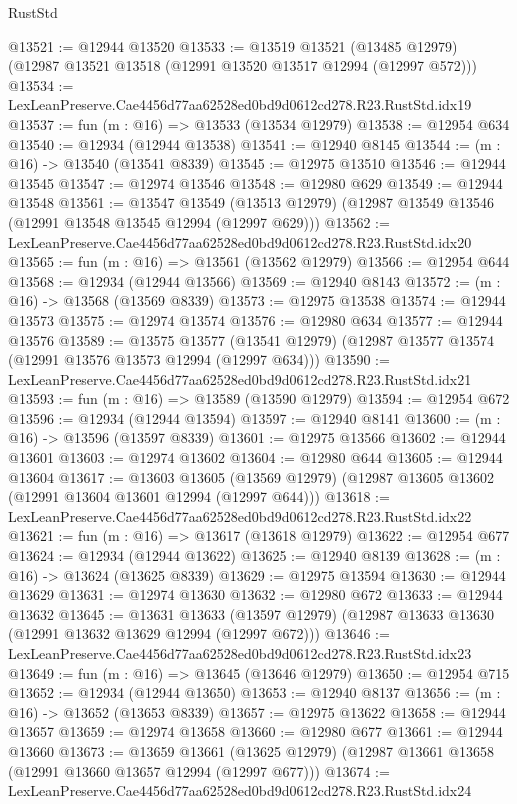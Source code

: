 \begin{lexlean}{RustStd}
\begin{coremodule}
@13521 := @12944 @13520
@13533 := @13519
    @13521
    (@13485 @12979)
    (@12987 @13521 @13518 (@12991 @13520 @13517 @12994 (@12997 @572)))
@13534 := LexLeanPreserve.Cae4456d77aa62528ed0bd9d0612cd278.R23.RustStd.idx19
@13537 := fun (m : @16) => @13533 (@13534 @12979)
@13538 := @12954 @634
@13540 := @12934 (@12944 @13538)
@13541 := @12940 @8145
@13544 := (m : @16) -> @13540 (@13541 @8339)
@13545 := @12975 @13510
@13546 := @12944 @13545
@13547 := @12974 @13546
@13548 := @12980 @629
@13549 := @12944 @13548
@13561 := @13547
    @13549
    (@13513 @12979)
    (@12987 @13549 @13546 (@12991 @13548 @13545 @12994 (@12997 @629)))
@13562 := LexLeanPreserve.Cae4456d77aa62528ed0bd9d0612cd278.R23.RustStd.idx20
@13565 := fun (m : @16) => @13561 (@13562 @12979)
@13566 := @12954 @644
@13568 := @12934 (@12944 @13566)
@13569 := @12940 @8143
@13572 := (m : @16) -> @13568 (@13569 @8339)
@13573 := @12975 @13538
@13574 := @12944 @13573
@13575 := @12974 @13574
@13576 := @12980 @634
@13577 := @12944 @13576
@13589 := @13575
    @13577
    (@13541 @12979)
    (@12987 @13577 @13574 (@12991 @13576 @13573 @12994 (@12997 @634)))
@13590 := LexLeanPreserve.Cae4456d77aa62528ed0bd9d0612cd278.R23.RustStd.idx21
@13593 := fun (m : @16) => @13589 (@13590 @12979)
@13594 := @12954 @672
@13596 := @12934 (@12944 @13594)
@13597 := @12940 @8141
@13600 := (m : @16) -> @13596 (@13597 @8339)
@13601 := @12975 @13566
@13602 := @12944 @13601
@13603 := @12974 @13602
@13604 := @12980 @644
@13605 := @12944 @13604
@13617 := @13603
    @13605
    (@13569 @12979)
    (@12987 @13605 @13602 (@12991 @13604 @13601 @12994 (@12997 @644)))
@13618 := LexLeanPreserve.Cae4456d77aa62528ed0bd9d0612cd278.R23.RustStd.idx22
@13621 := fun (m : @16) => @13617 (@13618 @12979)
@13622 := @12954 @677
@13624 := @12934 (@12944 @13622)
@13625 := @12940 @8139
@13628 := (m : @16) -> @13624 (@13625 @8339)
@13629 := @12975 @13594
@13630 := @12944 @13629
@13631 := @12974 @13630
@13632 := @12980 @672
@13633 := @12944 @13632
@13645 := @13631
    @13633
    (@13597 @12979)
    (@12987 @13633 @13630 (@12991 @13632 @13629 @12994 (@12997 @672)))
@13646 := LexLeanPreserve.Cae4456d77aa62528ed0bd9d0612cd278.R23.RustStd.idx23
@13649 := fun (m : @16) => @13645 (@13646 @12979)
@13650 := @12954 @715
@13652 := @12934 (@12944 @13650)
@13653 := @12940 @8137
@13656 := (m : @16) -> @13652 (@13653 @8339)
@13657 := @12975 @13622
@13658 := @12944 @13657
@13659 := @12974 @13658
@13660 := @12980 @677
@13661 := @12944 @13660
@13673 := @13659
    @13661
    (@13625 @12979)
    (@12987 @13661 @13658 (@12991 @13660 @13657 @12994 (@12997 @677)))
@13674 := LexLeanPreserve.Cae4456d77aa62528ed0bd9d0612cd278.R23.RustStd.idx24

\end{coremodule}
\end{lexlean}
